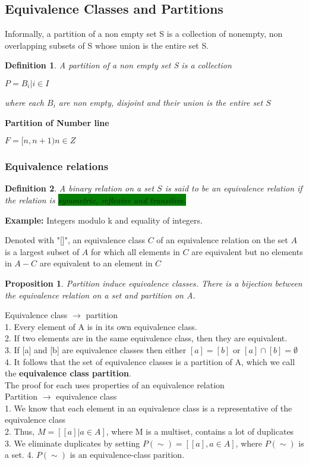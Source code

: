 \documentclass [12pt]{article}
\newtheorem {definition}{Definition}
\newtheorem {proposition}{Proposition}
\begin{document}
\subsection {Equivalence Classes and Partitions} 

Informally, a partition of a non empty set S is a collection of nonempty,
non overlapping subsets of S whose union is the entire set S. 

\begin {definition}
 A partition of a non empty set S is a collection 

\(P={B_i|i\in I}\) 

where each $B_i$ are non empty, disjoint and their union is the entire set
$S$ 
\end {definition}
 \textbf{Partition of Number line} 

\(F=[n,n+1)n\in Z\) 

\subsubsection {Equivalence relations} 

\begin {definition}
 A binary relation on a set $S$ is said to be an equivalence relation if
the relation is \colorbox {green}{symmetric, reflexive and transitive.}
\end {definition}

\textbf{Example:} Integers modulo k and equality of integers. 

Denoted with "[]", an equivalence class $C$ of an equivalence relation on
the set $A$ is a largest subset of $A$ for which all elements in $C$ are
equivalent but no elements in $A-C$ are equivalent to an element in $C$

\begin {proposition}
 Partition induce equivalence classes. There is a bijection between the
equivalence relation on a set and partition on A. 
\end {proposition}
 

Equivalence class $\rightarrow $ partition\\
1. Every element of A is in its own equivalence class.\\
2. If two elements are in the same equivalence class, then they are equivalent.\\
3. If [a] and [b] are equivalence classes then either $[a]=[b]$ or $[a]\cap [b]=\emptyset $\\
4. It follows that the set of equivalence classes is a partition of A, which
we call the \textbf{equivalence class partition}.\\
The proof for each uses properties of an equivalence relation \\
Partition $\rightarrow $ equivalence class\\
1. We know that each element in an equivalence class is a representative
of the equivalence class\\
2. Thus, \(M=[[a]|a\in A]\), where M is a multiset, contains a lot of duplicates\\
3. We eliminate duplicates by setting \(P(\sim )=[[a],a\in A]\), where $P(\sim )$
is a set. 4. $P(\sim )$ is an equivalence-class parition.  
\end{document}
